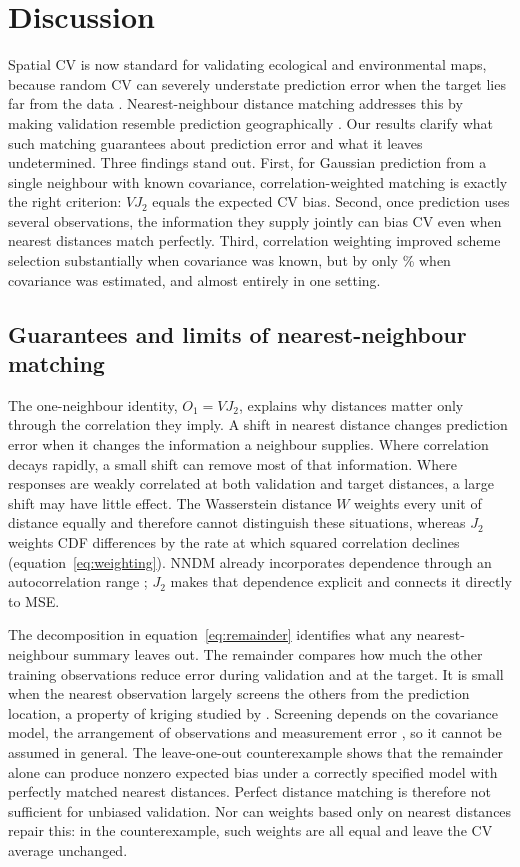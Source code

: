 \section{Discussion}
\label{sec:discussion}
Spatial CV is now standard for validating ecological and environmental maps, because random CV can severely understate prediction error when the target lies far from the data \citep{roberts2017cross,ploton2020spatial,meyer2022global}. Nearest-neighbour distance matching addresses this by making validation resemble prediction geographically \citep{mila2022nndm,linnenbrink2024knndm}. Our results clarify what such matching guarantees about prediction error and what it leaves undetermined. Three findings stand out. First, for Gaussian prediction from a single neighbour with known covariance, correlation-weighted matching is exactly the right criterion: $VJ_2$ equals the expected CV bias. Second, once prediction uses several observations, the information they supply jointly can bias CV even when nearest distances match perfectly. Third, correlation weighting improved scheme selection substantially when covariance was known, but by only \NestedReduction\% when covariance was estimated, and almost entirely in one setting.

\subsection{Guarantees and limits of nearest-neighbour matching}
The one-neighbour identity, $O_1=VJ_2$, explains why distances matter only through the correlation they imply. A shift in nearest distance changes prediction error when it changes the information a neighbour supplies. Where correlation decays rapidly, a small shift can remove most of that information. Where responses are weakly correlated at both validation and target distances, a large shift may have little effect. The Wasserstein distance $W$ weights every unit of distance equally and therefore cannot distinguish these situations, whereas $J_2$ weights CDF differences by the rate at which squared correlation declines (equation~\eqref{eq:weighting}). NNDM already incorporates dependence through an autocorrelation range \citep{mila2022nndm}; $J_2$ makes that dependence explicit and connects it directly to MSE.

The decomposition in equation~\eqref{eq:remainder} identifies what any nearest-neighbour summary leaves out. The remainder compares how much the other training observations reduce error during validation and at the target. It is small when the nearest observation largely screens the others from the prediction location, a property of kriging studied by \citet{stein2002screening}. Screening depends on the covariance model, the arrangement of observations and measurement error \citep{stein1999interpolation,stein2002screening}, so it cannot be assumed in general. The leave-one-out counterexample shows that the remainder alone can produce nonzero expected bias under a correctly specified model with perfectly matched nearest distances. Perfect distance matching is therefore not sufficient for unbiased validation. Nor can weights based only on nearest distances repair this: in the counterexample, such weights are all equal and leave the CV average unchanged.

